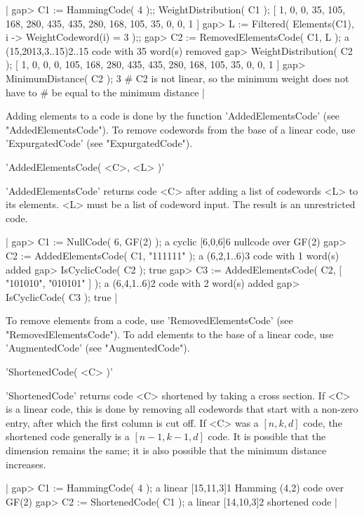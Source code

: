 |    gap> C1 := HammingCode( 4 );; WeightDistribution( C1 );
    [ 1, 0, 0, 35, 105, 168, 280, 435, 435, 280, 168, 105, 35, 0, 0, 1 ]
    gap> L := Filtered( Elements(C1), i -> WeightCodeword(i) = 3 );;
    gap> C2 := RemovedElementsCode( C1, L );
    a (15,2013,3..15)2..15 code with 35 word(s) removed
    gap> WeightDistribution( C2 );
    [ 1, 0, 0, 0, 105, 168, 280, 435, 435, 280, 168, 105, 35, 0, 0, 1 ]
    gap> MinimumDistance( C2 );
    3        # C2 is not linear, so the minimum weight does not have to
             # be equal to the minimum distance |

Adding elements  to a  code is  done by  the function 'AddedElementsCode'
(see "AddedElementsCode"). To remove codewords from the  base of a linear
code, use 'ExpurgatedCode' (see "ExpurgatedCode").


'AddedElementsCode( <C>, <L> )'

'AddedElementsCode' returns code <C> after adding a list of codewords <L>
to its elements. <L> must be  a list of codeword  input. The result is an
unrestricted code.

|    gap> C1 := NullCode( 6, GF(2) );
    a cyclic [6,0,6]6 nullcode over GF(2)
    gap> C2 := AddedElementsCode( C1, "111111" );
    a (6,2,1..6)3 code with 1 word(s) added
    gap> IsCyclicCode( C2 );
    true
    gap> C3 := AddedElementsCode( C2, [ "101010", "010101" ] );
    a (6,4,1..6)2 code with 2 word(s) added
    gap> IsCyclicCode( C3 );
    true |

To remove   elements from a     code, use   'RemovedElementsCode'    (see
"RemovedElementsCode"). To add elements to the base of a linear code, use
'AugmentedCode' (see "AugmentedCode").


'ShortenedCode( <C> )'

'ShortenedCode' returns code <C> shortened by taking a cross section.  If
<C> is a  linear code, this is done  by removing all codewords that start
with a non-zero entry, after which  the first column  is cut off.  If <C>
was a  $[n,k,d]$ code, the  shortened  code generally  is a $[n-1,k-1,d]$
code. It  is possible that  the dimension  remains the  same; it  is also
possible that the minimum distance increases.

|    gap> C1 := HammingCode( 4 );
    a linear [15,11,3]1 Hamming (4,2) code over GF(2)
    gap> C2 := ShortenedCode( C1 );
    a linear [14,10,3]2 shortened code |

